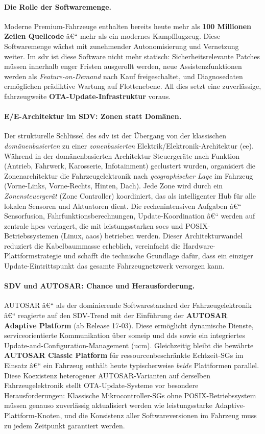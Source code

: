 ﻿\documentclass[12pt,a4paper,twoside]{article}
\begin{document}
\paragraph{Die Rolle der Softwaremenge.}
Moderne Premium-Fahrzeuge enthalten bereits heute mehr als
\textbf{100 Millionen Zeilen Quellcode} â€“ mehr als ein modernes
Kampfflugzeug. Diese Softwaremenge wächst mit zunehmender Autonomisierung
und Vernetzung weiter. Im \gls{sdv} ist diese Software nicht mehr statisch:
Sicherheitsrelevante Patches müssen innerhalb enger Fristen ausgerollt
werden, neue Assistenzfunktionen werden als \textit{Feature-on-Demand}
nach Kauf freigeschaltet, und Diagnosedaten ermöglichen prädiktive
Wartung auf Flottenebene. All dies setzt eine zuverlässige,
fahrzeugweite \textbf{OTA-Update-Infrastruktur} voraus.

\paragraph{E/E-Architektur im SDV: Zonen statt Domänen.}
Der strukturelle Schlüssel des \gls{sdv} ist der Übergang von der
klassischen \emph{domänenbasierten} zu einer \emph{zonenbasierten}
Elektrik/Elektronik-Architektur (\gls{ee}). Während in der domänenbasierten
Architektur Steuergeräte nach Funktion (Antrieb, Fahrwerk, Karosserie,
Infotainment) geclustert wurden, organisiert die Zonenarchitektur die
Fahrzeugelektronik nach \emph{geographischer Lage} im Fahrzeug
(Vorne-Links, Vorne-Rechts, Hinten, Dach). Jede Zone wird durch ein
\emph{Zonensteuergerät} (Zone Controller) koordiniert, das als
intelligenter Hub für alle lokalen Sensoren und Aktuatoren dient.
Die rechenintensiven Aufgaben â€“ Sensorfusion, Fahrfunktionsberechnungen,
Update-Koordination â€“ werden auf zentrale \glspl{hpc} verlagert, die
mit leistungsstarken \glspl{soc} und POSIX-Betriebssystemen
(Linux, \gls{aaos}) betrieben werden. Dieser Architekturwandel
reduziert die Kabelbaummasse erheblich, vereinfacht die
Hardware-Plattformstrategie und schafft die technische Grundlage
dafür, dass ein einziger Update-Eintrittspunkt das gesamte
Fahrzeugnetzwerk versorgen kann.

\paragraph{SDV und AUTOSAR: Chance und Herausforderung.}
AUTOSAR â€“ als der dominierende Softwarestandard der Fahrzeugelektronik â€“
reagierte auf den SDV-Trend mit der Einführung der
\textbf{AUTOSAR Adaptive Platform} (ab Release 17-03). Diese ermöglicht
dynamische Dienste, serviceorientierte Kommunikation über \gls{someip}
und \gls{dds} sowie ein integriertes Update-and-Configuration-Management
(\gls{ucm}). Gleichzeitig bleibt die bewährte
\textbf{AUTOSAR Classic Platform} für ressourcenbeschränkte Echtzeit-SGs
im Einsatz â€“ ein Fahrzeug enthält heute typischerweise \emph{beide}
Plattformen parallel. Diese Koexistenz heterogener AUTOSAR-Varianten
auf derselben Fahrzeugelektronik stellt OTA-Update-Systeme vor
besondere Herausforderungen: Klassische Mikrocontroller-SGs ohne
POSIX-Betriebssystem müssen genauso zuverlässig aktualisiert werden
wie leistungsstarke Adaptive-Plattform-Knoten, und die Konsistenz
aller Softwareversionen im Fahrzeug muss zu jedem Zeitpunkt
garantiert werden.
\end{document}
